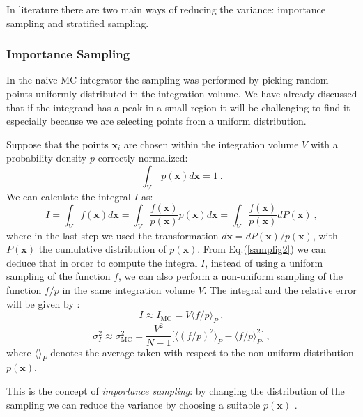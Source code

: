 \documentclass[../main/main.tex]{subfiles}
\begin{document}
In literature there are two main ways of reducing the variance: importance sampling and stratified sampling.

\subsubsection{Importance Sampling}
In the naive MC integrator the sampling was performed by picking random points uniformly distributed in the integration volume. 
We have already discussed that if the integrand has a peak in a small region it will be challenging to find it especially because we are selecting points from a uniform distribution. 

Suppose that the points $\textbf{x}_i$ are chosen within the integration volume $V$ with a probability density $p$ correctly normalized:
\begin{equation}
	\label{normalization}
	\int_{V} \;  p(\textbf{x})  d \textbf{x}  = 1 \ .
\end{equation}
We can calculate the integral $I$ as:
\begin{equation}
	\label{samplig2}
	I = \int_{V}   f(\textbf{x})  d \textbf{x}  =\int_{V}   \frac{f(\textbf{x})}{ p(\textbf{x})} p(\textbf{x})  d\textbf{x}
	= \int_{V}  \frac{f(\textbf{x})}{ p(\textbf{x})} dP(\textbf{x}) \ ,
\end{equation}
where in the last step we used the transformation $d\textbf{x} = dP(\textbf{x})/p(\textbf{x}) $, with $P(\textbf{x})$ the 
cumulative distribution of  $p(\textbf{x}) $.
\newline
From Eq.(\ref{samplig2}) we can deduce that in order to compute the integral $I$, instead of using a uniform sampling of the function $f$,
we can also perform a non-uniform sampling of the function $f/p$ in the same integration volume $V$.
\newline
The integral and the relative error will be given by \cite{unknown}:
\begin{equation}
	I \approx I_{\text{MC}}  = V \langle f/p \rangle_P \ ,
\end{equation}
\begin{equation}
	\label{sigma_IP}
	\sigma^2_I \approx \sigma^2_\text{MC} = \frac{V^2}{N-1} \bigg[\langle (f/p)^2 \rangle_P - \langle f/p \rangle^2_P \bigg] \ ,
\end{equation}
where $\langle \rangle_P$ denotes the average taken with respect to the non-uniform distribution $p(\textbf{x})$.

This is the concept of \emph{importance sampling}: by changing the distribution of the sampling we can reduce the variance by choosing
a suitable $p(\textbf{x})$ \cite{Lepage:1977sw, Lepage:2020tgj, unknown}.
\end{document}
